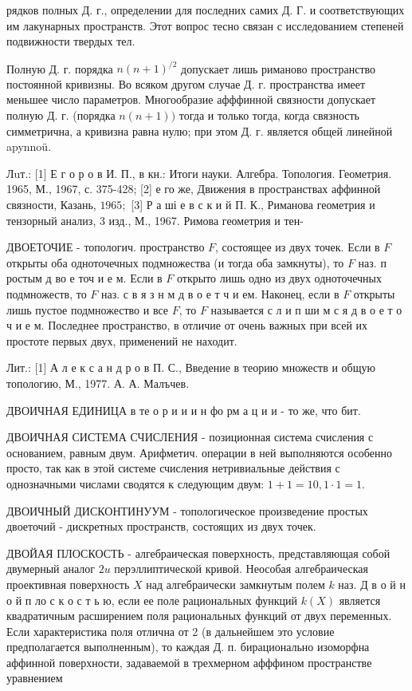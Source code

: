 \documentclass[10pt]{article}
\begin{document}
рядков полных Д. г., определении для последних самих Д. Г. и соответствующих им лакунарных пространств. Этот вопрос тесно связан с исследованием степеней подвижности твердых тел.



Полную Д. г. порядка $n(n+1)^{/ 2}$ допускает лишь риманово пространство постоянной кривизны. Во всяком другом случае Д. г. пространства имеет меньшее число параметров. Многообразие афффинной связности допускает полную Д. г. (порядка $n(n+1))$ тогда и только тогда, когда связность симметрична, а кривизна равна нулю; при этом Д. г. является общей линейной apynnoü.



Лuт.: [1] Е г о р о в И. П., в кн.: Итоги науки. Алгебра. Топология. Геометрия. 1965, М., 1967, с. 375-428; [2] е го же, Движения в пространствах аффинной связности, Казань, $1965 ;$ [3] Р а ші е в с к и й П. К., Риманова геометрия и тензорный анализ, 3 изд., М., 1967. Римова геометрия и тен-



ДВОЕТОЧИЕ - топологич. пространство $F$, состоящее из двух точек. Если в $F$ открыты оба одноточечных подмножества (и тогда оба замкнуты), то $F$ наз. п ростым д во е точ и е м. Если в $F$ открыто лишь одно из двух одноточечных подмножеств, то $F$ наз. с в я з н м д в о е т ч и ем. Наконец, если в $F$ открыты лишь пустое подмножество и все $F$, то $F$ называется с л и п ши м с я д в о е т о ч и е м. Последнее пространство, в отличие от очень важных при всей их простоте первых двух, применений не находит.



Лит.: [1] А л е к с а н д р о в П. С., Введение в теорию множеств и общую топологию, М., 1977. А. А. Малъчев.



ДВОИЧНАЯ ЕДИНИЦА в те о р и и и н фо рм а ц и и - то же, что бит.



ДВОИЧНАЯ СИСТЕМА СЧИСЛЕНИЯ - позиционная система счисления с основанием, равным двум. Арифметич. операции в ней выполняются особенно просто, так как в этой системе счисления нетривиальные действия с однозначными числами сводятся к следующим двум: $1+1=10,1 \cdot 1=1$.



ДВОИЧНЫЙ ДИСКОНТИНУУМ - топологическое произведение простых двоеточий - дискретных пространств, состоящих из двух точек.



ДВОЙАЯ ПЛОСКОСТЬ - алгебраическая поверхность, представляющая собой двумерный аналог $2 u$ перэллиптической кривой. Неособая алгебраическая проективная поверхность $X$ над алгебраически замкнутым полем $k$ наз. Д в о й н о й п ло с к о с т ь ю, если ее поле рациональных функций $k(X)$ является квадратичным расширением поля рациональных функций от двух переменных. Если характеристика поля отлична от 2 (в дальнейшем это условие предполагается выполненным), то каждая Д. п. бирационально изоморфна аффинной поверхности, задаваемой в трехмерном афффином пространстве уравнением
\end{document}
